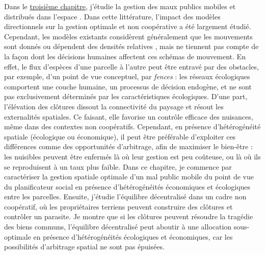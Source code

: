 \begin{displayquote}
\begin{displayquote}
\begin{displayquote}
{{{Dans le \hyperref[chapitre3]{troisième chapitre}, j'étudie la gestion des maux publics mobiles et distribués dans l'espace \citep{costello_private_2017}.
Dans cette littérature, l'impact des modèles directionnels sur la gestion optimale et non coopérative a été largement étudié. Cependant, les modèles existants considèrent généralement que les mouvements sont donnés ou dépendent des densités relatives \citep{huffaker_optimal_1992,bhat_controlling_1996, sanchirico_bioeconomics_1999}, mais ne tiennent pas compte de la façon dont les décisions humaines affectent ces schémas de mouvement. 
En effet, le flux d'espèces d'une parcelle à l'autre peut être entravé par des obstacles, par exemple, d'un point de vue conceptuel, par \textit{fences} : les réseaux écologiques comportent une couche humaine, un processus de décision endogène, et ne sont pas exclusivement déterminés par les caractéristiques écologiques. D'une part, l'élévation des clôtures dissout la connectivité du paysage et résout les externalités spatiales. Ce faisant, elle favorise un contrôle efficace des nuisances, même dans des contextes non coopératifs. Cependant, en présence d'hétérogénéité spatiale (écologique ou économique), il peut être préférable d'exploiter ces différences comme des opportunités d'arbitrage, afin de maximiser le bien-être : les nuisibles peuvent être enfermés là où leur gestion est peu coûteuse, ou là où ils se reproduisent à un taux plus faible. Dans ce chapitre, je commence par caractériser la gestion spatiale optimale d'un mal public mobile du point de vue du planificateur social en présence d'hétérogénéités économiques et écologiques entre les parcelles. Ensuite, j'étudie l'équilibre décentralisé dans un cadre non coopératif, où les propriétaires terriens peuvent construire des clôtures et contrôler un parasite. Je montre que si les clôtures peuvent résoudre la tragédie des biens communs, l'équilibre décentralisé peut aboutir à une allocation sous-optimale en présence d'hétérogénéités écologiques et économiques, car les possibilités d'arbitrage spatial ne sont pas épuisées. \\

}}}
\end{displayquote}
\end{displayquote}
\end{displayquote}
